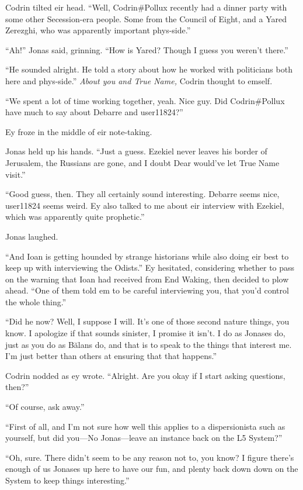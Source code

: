 Codrin tilted eir head. ``Well, Codrin\#Pollux recently had a dinner party with some other Secession-era people. Some from the Council of Eight, and a Yared Zerezghi, who was apparently important phys-side.''

``Ah!'' Jonas said, grinning. ``How is Yared? Though I guess you weren't there.''

``He sounded alright. He told a story about how he worked with politicians both here and phys-side.'' \emph{About you and True Name,} Codrin thought to emself.

``We spent a lot of time working together, yeah. Nice guy. Did Codrin\#Pollux have much to say about Debarre and user11824?''

Ey froze in the middle of eir note-taking.

Jonas held up his hands. ``Just a guess. Ezekiel never leaves his border of Jerusalem, the Russians are gone, and I doubt Dear would've let True Name visit.''

``Good guess, then. They all certainly sound interesting. Debarre seems nice, user11824 seems weird. Ey also talked to me about eir interview with Ezekiel, which was apparently quite prophetic.''

Jonas laughed.

``And Ioan is getting hounded by strange historians while also doing eir best to keep up with interviewing the Odists.'' Ey hesitated, considering whether to pass on the warning that Ioan had received from End Waking, then decided to plow ahead. ``One of them told em to be careful interviewing you, that you'd control the whole thing.''

``Did he now? Well, I suppose I will. It's one of those second nature things, you know. I apologize if that sounds sinister, I promise it isn't. I do as Jonases do, just as you do as Bălans do, and that is to speak to the things that interest me. I'm just better than others at ensuring that that happens.''

Codrin nodded as ey wrote. ``Alright. Are you okay if I start asking questions, then?''

``Of course, ask away.''

``First of all, and I'm not sure how well this applies to a dispersionista such as yourself, but did you---No Jonas---leave an instance back on the L5 System?''

``Oh, sure. There didn't seem to be any reason not to, you know? I figure there's enough of us Jonases up here to have our fun, and plenty back down down on the System to keep things interesting.''

